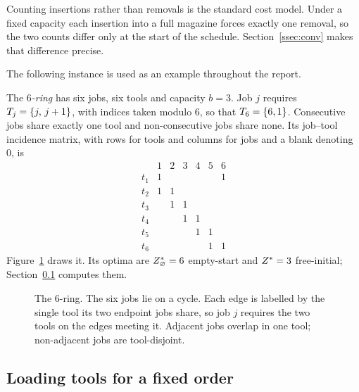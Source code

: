 Counting insertions rather than removals is the standard cost model. Under a fixed
capacity each insertion into a full magazine forces exactly one removal, so the two
counts differ only at the start of the schedule. Section~\ref{ssec:conv} makes that
difference precise.

The following instance is used as an example throughout the report.

\begin{example}\label{ex:ring}
The \emph{$6$-ring} has six jobs, six tools and capacity $b=3$. Job $j$ requires
$T_j=\{j,\,j+1\}$, with indices taken modulo $6$, so that $T_6=\{6,1\}$.
Consecutive jobs share exactly one tool and non-consecutive jobs share none. Its
job--tool incidence matrix, with rows for tools and columns for jobs and a blank
denoting $0$, is
\[
\begin{array}{c|cccccc}
      & 1 & 2 & 3 & 4 & 5 & 6\\\hline
 t_1  & 1 &   &   &   &   & 1\\
 t_2  & 1 & 1 &   &   &   &  \\
 t_3  &   & 1 & 1 &   &   &  \\
 t_4  &   &   & 1 & 1 &   &  \\
 t_5  &   &   &   & 1 & 1 &  \\
 t_6  &   &   &   &   & 1 & 1
\end{array}
\]
Figure~\ref{fig:ring} draws it. Its optima are $Z^{\ast}_{\varnothing}=6$ empty-start and
$Z^{\ast}=3$ free-initial; Section~\ref{ssec:ktns} computes them.
\end{example}

\begin{figure}[h]\centering
{}
\caption{The $6$-ring. The six jobs lie on a cycle. Each edge is labelled by the
single tool its two endpoint jobs share, so job $j$ requires the two tools on the
edges meeting it. Adjacent jobs overlap in one tool; non-adjacent jobs are
tool-disjoint.}\label{fig:ring}
\end{figure}

\subsection{Loading tools for a fixed order}\label{ssec:ktns}

